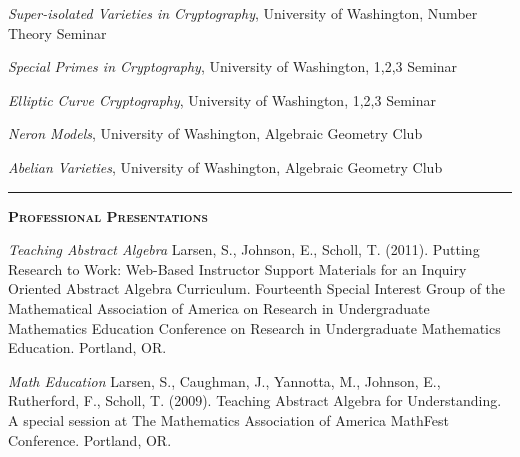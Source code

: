 \documentclass[12pt]{article}
\newcommand{\sectionheading}[1]
{
\bigskip %
\noindent
\hspace{-6.5mm}\textcolor{Gray}{\rule[.75mm]{21.5mm}{1mm}} %
\hspace{.2mm}	%
{\large{\textbf{\textsc{#1}}}} %
}
\newenvironment{date_section}
	{
	\vspace{-1ex}
	\leftmargini = 15ex
		\begin{itemize}[
			labelsep = *,
			labelwidth = 9ex,
			labelindent = 0ex,
			itemindent = !,
			font=\normalfont,
			align=parleft
		]{}
		\itemsep=-1.5mm
	}
	{\end{itemize}\vspace{-2ex}}
\newcommand{\yearmo}[2]{
	\item[
		{\makebox[1ex][r]{#1}}
		\hspace{1ex}
		{\makebox[1ex][l]{#2} }
		] }
\begin{document}
		\begin{date_section}

			\yearmo{2017}{May.} %
				\emph{Super-isolated Varieties in Cryptography},
				University of Washington,
				Number Theory Seminar

			\yearmo{2016}{Nov.} %
				\emph{Special Primes in Cryptography},
				University of Washington,
				1,2,3 Seminar

			\yearmo{2015}{Nov.} %
				\emph{Elliptic Curve Cryptography},
				University of Washington,
				1,2,3 Seminar
			
			\yearmo{2015}{Aug.} %
				\emph{Neron Models},
				University of Washington,
				Algebraic Geometry Club
			
			\yearmo{2015}{June} %
				\emph{Abelian Varieties},
				University of Washington,
				Algebraic Geometry Club
			
%

		\end{date_section}

	\sectionheading{Professional Presentations}%

		\begin{date_section}

			\yearmo{2011}{} %
				\emph{Teaching Abstract Algebra}
				Larsen, S., Johnson, E., Scholl, T. (2011).
				Putting Research to Work: Web-Based Instructor
				Support Materials for an Inquiry Oriented
				Abstract Algebra Curriculum. Fourteenth Special
				Interest Group of the Mathematical Association
				of America on Research in Undergraduate
				Mathematics Education Conference on Research
				in Undergraduate Mathematics Education.
				Portland, OR.

			\yearmo{2009}{} %
				\emph{Math Education}
				Larsen, S., Caughman, J., Yannotta, M.,
				Johnson, E., Rutherford, F., Scholl, T.
				(2009). Teaching Abstract Algebra for
				Understanding. A special session at The
				Mathematics Association of America MathFest
				Conference. Portland, OR.

		\end{date_section}
\end{document}
